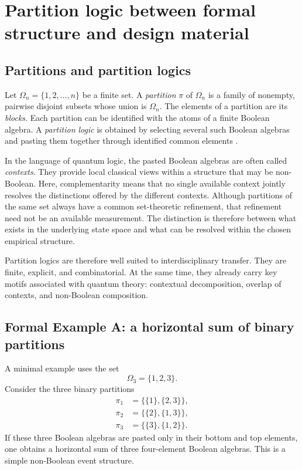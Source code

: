 \documentclass[
  10pt,
  twocolumn,
  aps,
  pra,
  showkeys,
  amsmath,amssymb,
  longbibliography
]{revtex4-2}
\begin{document}
\section{Partition logic between formal structure and design material}

\subsection{Partitions and partition logics}

Let \(\Omega_n=\{1,2,\dots,n\}\) be a finite set. A \emph{partition} \(\pi\) of \(\Omega_n\) is a family of nonempty, pairwise disjoint subsets whose union is \(\Omega_n\). The elements of a partition are its \emph{blocks}. Each partition can be identified with the atoms of a finite Boolean algebra. A \emph{partition logic} is obtained by selecting several such Boolean algebras and pasting them together through identified common elements \cite{schaller-92,dvur-pul-svo,svozil-2001-eua}.

In the language of quantum logic, the pasted Boolean algebras are often called \emph{contexts}. They provide local classical views within a structure that may be non-Boolean. Here, complementarity means that no single available context jointly resolves the distinctions offered by the different contexts. Although partitions of the same set always have a common set-theoretic refinement, that refinement need not be an available measurement. The distinction is therefore between what exists in the underlying state space and what can be resolved within the chosen empirical structure.

Partition logics are therefore well suited to interdisciplinary transfer. They are finite, explicit, and combinatorial. At the same time, they already carry key motifs associated with quantum theory: contextual decomposition, overlap of contexts, and non-Boolean composition.

\subsection{Formal Example A: a horizontal sum of binary partitions}

A minimal example uses the set
\begin{equation}
\Omega_3=\{1,2,3\}.
\end{equation}
Consider the three binary partitions
\begin{align}
\pi_1 &= \{\{1\},\{2,3\}\},
\nonumber\\
\pi_2 &= \{\{2\},\{1,3\}\},
\nonumber\\
\pi_3 &= \{\{3\},\{1,2\}\}.
\label{eq:threepartitions}
\end{align}
If these three Boolean algebras are pasted only in their bottom and top elements, one obtains a horizontal sum of three four-element Boolean algebras. This is a simple non-Boolean event structure.
\end{document}
